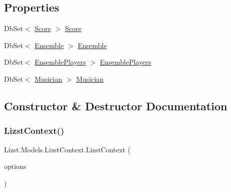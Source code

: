 \subsection*{Properties}
\begin{DoxyCompactItemize}
\item 
Db\+Set$<$ \mbox{\hyperlink{class_lizst_1_1_models_1_1_score}{Score}} $>$ \mbox{\hyperlink{class_lizst_1_1_models_1_1_lizst_context_a758a5c3cce37a033dffba6fa82c1ea8d}{Score}}
\item 
Db\+Set$<$ \mbox{\hyperlink{class_lizst_1_1_models_1_1_ensemble}{Ensemble}} $>$ \mbox{\hyperlink{class_lizst_1_1_models_1_1_lizst_context_abe1c3dea95c9c4d828f76b14d5668387}{Ensemble}}
\item 
Db\+Set$<$ \mbox{\hyperlink{class_lizst_1_1_models_1_1_ensemble_players}{Ensemble\+Players}} $>$ \mbox{\hyperlink{class_lizst_1_1_models_1_1_lizst_context_ad07c66afee1cc463716228af4df4e802}{Ensemble\+Players}}
\item 
Db\+Set$<$ \mbox{\hyperlink{class_lizst_1_1_models_1_1_musician}{Musician}} $>$ \mbox{\hyperlink{class_lizst_1_1_models_1_1_lizst_context_a0bb99fe24a7f575f794d21c0aa5f3248}{Musician}}
\end{DoxyCompactItemize}


\subsection{Constructor \& Destructor Documentation}
\mbox{\label{class_lizst_1_1_models_1_1_lizst_context_a6c6aea6e6089842f700119337bd3818f}} 
\subsubsection{\texorpdfstring{LizstContext()}{LizstContext()}}
{\footnotesize\ttfamily Lizst.\+Models.\+Lizst\+Context.\+Lizst\+Context (\begin{DoxyParamCaption}\item[{Db\+Context\+Options$<$ \mbox{\hyperlink{class_lizst_1_1_models_1_1_lizst_context}{Lizst\+Context}} $>$}]{options }\end{DoxyParamCaption})}



